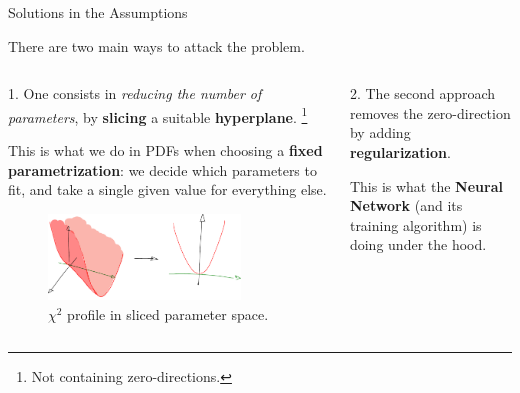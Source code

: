 \documentclass[9pt]{beamer}
\begin{document}
\begin{frame}{Solutions in the Assumptions}
    \vspace*{10pt}
    \begin{center}
        There are two main ways to attack the problem.
    \end{center}
    \vspace*{10pt}

    \begin{columns}
        \begin{column}{0.5\textwidth}
            1. One consists in \textit{reducing the number of parameters}, by
            \textbf{slicing} a suitable \textbf{hyperplane}.
            \footnote{Not containing zero-directions.}
            \vspace*{10pt}

            This is what we do in PDFs when choosing a \alert{\textbf{fixed
            parametrization}}: we decide which parameters to fit, and take a
            single given value for everything else.
            \vspace*{10pt}

            \begin{figure}
                \centering
                \includegraphics[width=0.8\textwidth]{sliced}
                \caption{$\chi^2$ profile in sliced parameter space.}
            \end{figure}
            \vspace*{10pt}
        \end{column}
        \begin{column}{0.5\textwidth}
            2. The second approach removes the zero-direction by adding
            \textbf{regularization}.
            \vspace*{10pt}

            This is what the \alert{\textbf{Neural Network}} (and its training
            algorithm) is doing under the hood.
            \vspace*{10pt}


\end{column}
\end{columns}
\end{frame}
\end{document}
